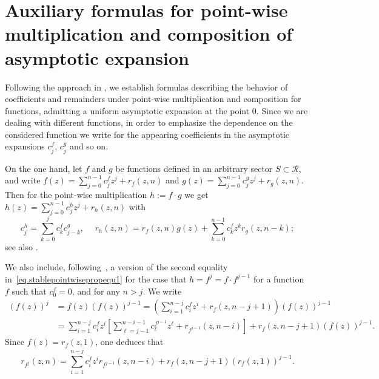 \documentclass[11pt,a4paper]{article}
\theoremstyle{plain}
\theoremstyle{definition}
\begin{document}
\section{Auxiliary formulas for point-wise multiplication and composition of asymptotic expansion}\label{sec.formula}

Following the approach in \cite{AubersonMennessier81}, we establish formulas describing the behavior of coefficients and remainders under point-wise multiplication and composition for functions, admitting a uniform asymptotic expansion at the point 0. 
Since we are dealing with different functions, in order to emphasize the dependence on the considered function we write for the appearing coefficients in the asymptotic expansions $c_j^f$, $c_j^g$ and so on. 

On the one hand, let $f$ and $g$ be functions defined in an arbitrary sector $S\subset \mathcal{R}$, and write $f(z)=\sum_{j=0}^{n-1}c^f_jz^j+r_f(z,n)$ and $g(z)=\sum_{j=0}^{n-1}c^g_jz^j+r_g(z,n)$. Then for the  point-wise multiplication $h:=f\cdot g$ we get $h(z)=\sum_{j=0}^{n-1}c^h_jz^j+r_h(z,n)$ with
\begin{equation}\label{eq.stablepointwisepropequ1}
c^h_j=\sum_{k=0}^jc^f_kc^g_{j-k},\hspace{15pt}r_h(z,n)=r_f(z,n)g(z)+\sum_{k=0}^{n-1}c^f_kz^kr_g(z,n-k);
\end{equation}
see also \cite[$(33)$]{AubersonMennessier81}.  

We also include, following~\cite[$(A.3)$]{AubersonMennessier81}, a version of the second equality in~\eqref{eq.stablepointwisepropequ1} for the case that $h=f^j=f\cdot f^{j-1}$ for a function $f$ such that $c_0^f=0$, and for any $n>j$. We write
\begin{align*}
(f(z))^j&=f(z)(f(z))^{j-1}=\left(\sum_{i=1}^{n-j}c^f_i z^i+r_f(z,n-j+1)\right)(f(z))^{j-1}\\
		&=\sum_{i=1}^{n-j}c^f_i z^i\left[\sum_{\ell=j-1}^{n-i-1}c^{f^{j-1}}_{\ell}z^{\ell}+r_{f^{j-1}}(z,n-i)\right]+r_f(z,n-j+1)(f(z))^{j-1}.
	\end{align*}
Since $f(z)=r_f(z,1)$, one deduces that
	\begin{equation}\label{eq.remaindern.fpowerj}
		 r_{f^j}(z,n)=\sum_{i=1}^{n-j}c^f_iz^ir_{f^{j-1}}(z,n-i)+r_f(z,n-j+1)\left(r_f(z,1)\right)^{j-1}.
	\end{equation}
\end{document}
